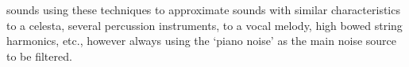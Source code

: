 sounds using these techniques to approximate sounds with similar characteristics to a celesta, several percussion instruments, to a vocal melody, high bowed string harmonics, etc., however always using the `piano noise' as the main noise source to be filtered. 
 

